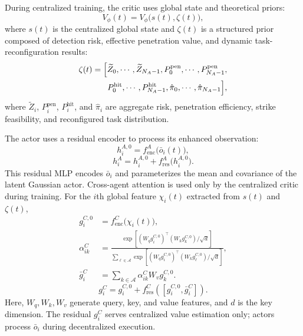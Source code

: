 \documentclass[unbranded]{cja}
\begin{document}
During centralized training, the critic uses global state and theoretical priors:
\begin{equation}
V_{\phi}(t)
=
V_{\phi}\bigl(s(t),\zeta(t)\bigr),
\end{equation}
where $s(t)$ is the centralized global state and $\zeta(t)$ is a structured prior composed of detection risk, effective penetration value, and dynamic task-reconfiguration results:
\begin{equation}
\begin{aligned}
\zeta(t)
=
\Bigl[
\widetilde Z_0,\cdots,\widetilde Z_{N_A-1},
P_0^{\mathrm{pen}},\cdots,P_{N_A-1}^{\mathrm{pen}},\\
P_0^{\mathrm{hit}},\cdots,P_{N_A-1}^{\mathrm{hit}},
\hat{\pi}_0,\cdots,\hat{\pi}_{N_A-1}
\Bigr],
\end{aligned}
\end{equation}
where $\widetilde Z_i$, $P_i^{\mathrm{pen}}$, $P_i^{\mathrm{hit}}$, and $\hat{\pi}_i$ are aggregate risk, penetration efficiency, strike feasibility, and reconfigured task distribution.

The actor uses a residual encoder to process its enhanced observation:
\begin{equation}
h_i^{A,0}=f_{\mathrm{enc}}^{A}\bigl(\bar o_i(t)\bigr),
\end{equation}
\begin{equation}
h_i^{A}
=
h_i^{A,0}+f_{\mathrm{res}}^{A}\bigl(h_i^{A,0}\bigr).
\end{equation}
This residual MLP encodes $\bar o_i$ and parameterizes the mean and covariance of the latent Gaussian actor.
Cross-agent attention is used only by the centralized critic during training. For the $i$th global feature $\chi_i(t)$ extracted from $s(t)$ and $\zeta(t)$,
\begin{equation}
\begin{aligned}
g_i^{C,0}
&=f_{\mathrm{enc}}^{C}\bigl(\chi_i(t)\bigr),\\
\alpha_{ik}^{C}
&=
\frac{
\exp\left[(W_qg_i^{C,0})^{\top}(W_kg_k^{C,0})/\sqrt d\right]
}{
\sum_{\ell\in\mathcal A}
\exp\left[(W_qg_i^{C,0})^{\top}(W_kg_\ell^{C,0})/\sqrt d\right]
},\\
\bar g_i^{C}
&=\sum_{k\in\mathcal A}\alpha_{ik}^{C}W_vg_k^{C,0}.
\end{aligned}
\end{equation}
\begin{equation}
g_i^{C}
=
g_i^{C,0}
+f_{\mathrm{res}}^{C}\!\left([g_i^{C,0},\bar g_i^{C}]\right).
\end{equation}
Here, $W_q,W_k,W_v$ generate query, key, and value features, and $d$ is the key dimension. The residual $g_i^C$ serves centralized value estimation only; actors process $\bar o_i$ during decentralized execution.
\end{document}
